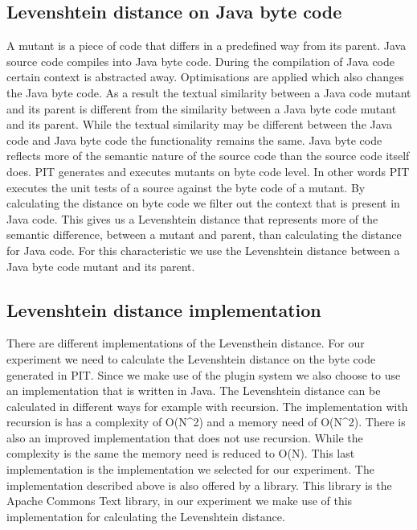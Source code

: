 \documentclass[../../main]{subfiles}
\begin{document}
\subsection{Levenshtein distance on Java byte code}
A mutant is a piece of code that differs in a predefined way from its parent.
Java source code compiles into Java byte code.
During the compilation of Java code certain context is abstracted away\cite{byteCodeEngineering}.
Optimisations are applied which also changes the Java byte code\cite{byteCodeEngineering}.
As a result the textual similarity between a Java code mutant and its parent is different from the similarity between a Java byte code mutant and its parent.
While the textual similarity may be different between the Java code and Java byte code the functionality remains the same.
Java byte code reflects more of the semantic nature of the source code than the source code itself does. 
PIT generates and executes mutants on byte code level\cite{pitestBytecode}. 
In other words PIT executes the unit tests of a source against the byte code of a mutant.
\newline
By calculating the distance on byte code we filter out the context that is present in Java code.
This gives us a Levenshtein distance that represents more of the semantic difference, between a mutant and parent, than calculating the distance for Java code.
For this characteristic we use the Levenshtein distance between a Java byte code mutant and its parent.

\subsection{Levenshtein distance implementation}
There are different implementations of the Levensthein distance.
For our experiment we need to calculate the Levenshtein distance on the byte code generated in PIT.
Since we make use of the plugin system we also choose to use an implementation that is written in Java.
The Levenshtein distance can be calculated in different ways for example with recursion.
The implementation with recursion is has a complexity of O(N\^{}2) and a memory need of O(N\^{}2).
There is also an improved implementation that does not use recursion.
While the complexity is the same the memory need is reduced to O(N).
This last implementation is the implementation we selected for our experiment.
The implementation described above is also offered by a library.
This library is the Apache Commons Text library\cite{commonsText}, in our experiment we make use of this implementation for calculating the Levenshtein distance.
\end{document}
